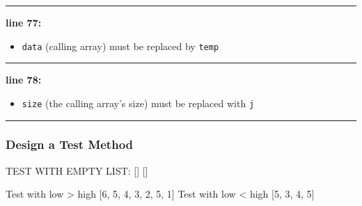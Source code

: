 \vspace{0.5cm}
\noindent
\textcolor{RedOrange}{\rule{\textwidth}{0.5pt}}
\vspace{-0.1cm}

\noindent
\begin{minipage}{0.15\textwidth}
    \textcolor{RedOrange}{\textbf{line 77:}}
\end{minipage}
\begin{minipage}{0.85\textwidth}
    \begin{itemize}
        \item[] \texttt{data} (\textcolor{RedOrange}{calling array}) must be replaced by \texttt{temp}
    \end{itemize}
\end{minipage}

\vspace{0.1cm}
\noindent
\textcolor{RedOrange}{\rule{\textwidth}{0.5pt}}
\vspace{-0.1cm}

\noindent
\begin{minipage}{0.15\textwidth}
    \textcolor{RedOrange}{\textbf{line 78:}}
\end{minipage}
\begin{minipage}{0.85\textwidth}
    \begin{itemize}
        \item[] \texttt{size} \textcolor{RedOrange}{(the calling array's size)} must be replaced with \texttt{j}
    \end{itemize}
\end{minipage}

\vspace{0.1cm}
\noindent
\textcolor{RedOrange}{\rule{\textwidth}{0.5pt}}

\subsubsection{Design a Test Method}


\begin{tightcode}[text]
TEST WITH EMPTY LIST: []
[]
\end{tightcode}

\newpage

\begin{tightcode}
Test with low > high
[6, 5, 4, 3, 2, 5, 1]
Test with low < high 
[5, 3, 4, 5]
\end{tightcode}













